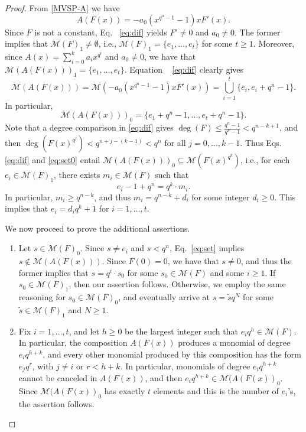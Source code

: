\documentclass[11pt]{amsart}
\newcommand{\m}{\mathcal M}
\theoremstyle{definition}
\theoremstyle{remark}
\begin{document}
\begin{proof}
From  \eqref{MVSP-A} we have 
\begin{equation}\label{eq:dif}
A(F(x))=-a_0(x^{q^n-1}-1)xF'(x).
\end{equation}
Since  $F$ is not a constant, Eq.~ \eqref{eq:dif}  yields $F'\neq 0$ and $a_0\neq0$. The former implies that  $\m(F)_1\neq \emptyset$, i.e., $\m(F)_1=\{e_1, \ldots, e_t\}$ for some $t\geq 1$.  Moreover, since $A(x)=\sum_{i=0}^ka_ix^{q^{i}}$ and $a_0\neq0$, we have   that $\m(A(F(x)))_1=\{e_1, \ldots, e_t\}$. Equation ~ \eqref{eq:dif}  clearly gives
 \begin{equation}\label{eq:set}\m(A(F(x)))=\m(-a_0(x^{q^n-1}-1)xF'(x))=\bigcup_{i=1}^t \{e_i, e_i+q^{n}-1\}.\end{equation}
 In particular, 
\begin{equation}\label{eq:set0}   \m(A(F(x)))_0=\{e_1+q^n-1, \ldots, e_t+q^n-1\}.  \end{equation}
Note that a degree comparison in \eqref{eq:dif} gives $\deg(F)\le \frac{q^n-1}{q^k-1}<q^{n-k+1}$, and then $\deg(F(x)^{q^j})<q^{n+j-(k-1)}<q^n$ for all $j=0, \ldots, k-1$. Thus   Eqs.~ \eqref{eq:dif}  and \eqref{eq:set0} entail $ \m(A(F(x)))_0\subseteq  \m (F(x)^{q^k})$, i.e., 
 for each $ e_i\in \m(F)_1 $, there exists $m_i \in \m(F)$ such that
$$e_i-1+q^n=q^k\cdot m_i.$$
In particular, $m_i\ge q^{n-k}$, and  thus  $m_i=q^{n-k}+d_i$ for some integer $d_i\geq0$.
This implies that $e_i=d_iq^k+1$ for $i=1, \ldots, t$. 

We now proceed to prove the additional assertions.
\begin{enumerate}[\rm(i)]
\item Let  $s\in \m(F)_0$. Since $s\ne e_i$ and  $s<q^n$, Eq.~\eqref{eq:set} implies $s\not\in \m(A(F(x)))$. Since $F(0)=0$, we have that $s\ne 0$, and thus the former implies that $s=q^i\cdot s_0$ for some $s_0\in \m(F)$ and some $i\ge 1$. If $s_0\in \m(F)_1$, then our assertion follows. Otherwise, we employ the same reasoning  for $s_0\in \m(F)_0$, and eventually arrive at  $s=\tilde{s}q^N$ for some  $\tilde{s}\in \m(F)_1$ and $N\ge 1$.
\item Fix $i=1,\ldots, t$, and let $h\ge 0$ be the largest integer such that $e_iq^h\in \m(F)$. In particular, the composition $A(F(x))$ produces a monomial of degree $e_iq^{h+k}$, and every other monomial produced by this composition has the form $e_jq^r$, with $j\ne i$ or $r<h+k$. In particular, monomials of degree $e_iq^{h+k}$ cannot be canceled in $A(F(x))$, and then  $e_iq^{h+k}\in \m(A(F(x))_0$. Since $\m(A(F(x))_0$ has exactly $t$ elements and this is the number of $e_i$'s, the assertion follows.
\end{enumerate}
\end{proof}
\end{document}
